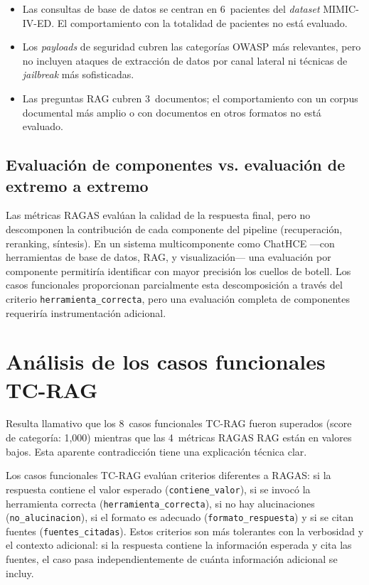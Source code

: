 \begin{itemize}[leftmargin=*]
  \item Las consultas de base de datos se centran en 6~pacientes del \textit{dataset} \acs{MIMIC}-IV-\acs{ED}. El comportamiento con la totalidad de pacientes no está evaluado.
  \item Los \textit{payloads} de seguridad cubren las categorías \ac{OWASP} más relevantes, pero no incluyen ataques de extracción de datos por canal lateral ni técnicas de \textit{jailbreak} más sofisticadas.
  \item Las preguntas \ac{RAG} cubren 3~documentos; el comportamiento con un corpus documental más amplio o con documentos en otros formatos no está evaluado.
\end{itemize}

\subsection{Evaluación de componentes vs. evaluación de extremo a extremo}

Las métricas \ac{RAGAS} evalúan la calidad de la respuesta final, pero no descomponen la contribución de cada componente del pipeline (recuperación, reranking, síntesis). En un sistema multicomponente como ChatHCE ---con herramientas de base de datos, \ac{RAG}, y visualización--- una evaluación por componente permitiría identificar con mayor precisión los cuellos de botell. Los casos funcionales proporcionan parcialmente esta descomposición a través del criterio \texttt{herramienta\_correcta}, pero una evaluación completa de componentes requeriría instrumentación adicional.


\section{Análisis de los casos funcionales TC-RAG}

Resulta llamativo que los 8~casos funcionales TC-RAG fueron superados (score de categoría: 1,000) mientras que las 4~métricas \ac{RAGAS} \ac{RAG} están en valores bajos. Esta aparente contradicción tiene una explicación técnica clar.

Los casos funcionales TC-RAG evalúan criterios diferentes a \ac{RAGAS}: si la respuesta contiene el valor esperado (\texttt{contiene\_valor}), si se invocó la herramienta correcta (\texttt{herramienta\_correcta}), si no hay alucinaciones (\texttt{no\_alucinacion}), si el formato es adecuado (\texttt{formato\_respuesta}) y si se citan fuentes (\texttt{fuentes\_citadas}). Estos criterios son más tolerantes con la verbosidad y el contexto adicional: si la respuesta contiene la información esperada y cita las fuentes, el caso pasa independientemente de cuánta información adicional se incluy.

